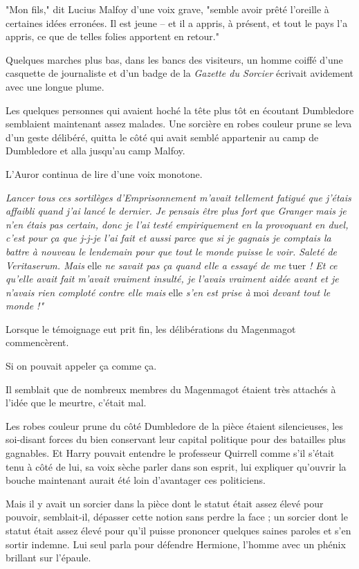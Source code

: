 "Mon fils," dit Lucius Malfoy d'une voix grave, "semble avoir prêté l'oreille à certaines idées erronées. Il est jeune – et il a appris, à présent, et tout le pays l'a appris, ce que de telles folies apportent en retour."

Quelques marches plus bas, dans les bancs des visiteurs, un homme coiffé d'une casquette de journaliste et d'un badge de la \emph{Gazette du Sorcier}  écrivait avidement avec une longue plume.

Les quelques personnes qui avaient hoché la tête plus tôt en écoutant Dumbledore semblaient maintenant assez malades. Une sorcière en robes couleur prune se leva d'un geste délibéré, quitta le côté qui avait semblé appartenir au camp de Dumbledore et alla jusqu'au camp Malfoy.

L'Auror continua de lire d'une voix monotone.

\emph{Lancer tous ces sortilèges d'Emprisonnement m'avait tellement fatigué que j'étais affaibli quand j'ai lancé le dernier. Je pensais être plus fort que Granger mais je n'en étais pas certain, donc je l'ai testé empiriquement en la provoquant en duel, c'est pour ça que j-j-je l'ai fait et aussi parce que si je gagnais je comptais la battre à nouveau le lendemain pour que tout le monde puisse le voir. Saleté de Veritaserum. Mais } elle\emph{ ne savait pas ça quand elle a essayé de me } tuer \emph{! Et ce qu'elle avait fait m'avait vraiment insulté, je l'avais vraiment aidée avant et je n'avais rien comploté contre elle mais } elle\emph{ s'en est prise à } moi\emph{ devant tout le monde !"} 

Lorsque le témoignage eut prit fin, les délibérations du Magenmagot commencèrent.

Si on pouvait appeler ça comme ça.

Il semblait que de nombreux membres du Magenmagot étaient très attachés à l'idée que le meurtre, c'était mal.

Les robes couleur prune du côté Dumbledore de la pièce étaient silencieuses, les soi-disant forces du bien conservant leur capital politique pour des batailles plus gagnables. Et Harry pouvait entendre le professeur Quirrell comme s'il s'était tenu à côté de lui, sa voix sèche parler dans son esprit, lui expliquer qu'ouvrir la bouche maintenant aurait été loin d'avantager ces politiciens.

Mais il y avait un sorcier dans la pièce dont le statut était assez élevé pour pouvoir, semblait-il, dépasser cette notion sans perdre la face ; un sorcier dont le statut était assez élevé pour qu'il puisse prononcer quelques saines paroles et s'en sortir indemne. Lui seul parla pour défendre Hermione, l'homme avec un phénix brillant sur l'épaule.

